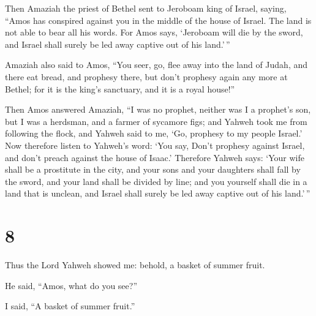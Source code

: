  Then Amaziah the priest of Bethel sent to Jeroboam king of
Israel, saying, ``Amos has conspired against you in the middle of the
house of Israel. The land is not able to bear all his words.
 For Amos says, `Jeroboam will die by the sword, and Israel
shall surely be led away captive out of his land.'\,''

 Amaziah also said to Amos, ``You seer, go, flee away into
the land of Judah, and there eat bread, and prophesy there,
 but don't prophesy again any more at Bethel; for it is the
king's sanctuary, and it is a royal house!''

 Then Amos answered Amaziah, ``I was no prophet, neither
was I a prophet's son, but I was a herdsman, and a farmer of sycamore
figs;  and Yahweh took me from following the flock, and
Yahweh said to me, `Go, prophesy to my people Israel.'  Now
therefore listen to Yahweh's word: `You say, Don't prophesy against
Israel, and don't preach against the house of Isaac.' 
Therefore Yahweh says: `Your wife shall be a prostitute in the city, and
your sons and your daughters shall fall by the sword, and your land
shall be divided by line; and you yourself shall die in a land that is
unclean, and Israel shall surely be led away captive out of his
land.'\,''

\hypertarget{section-7}{%
\section{8}\label{section-7}}

 Thus the Lord Yahweh showed me: behold, a basket of summer
fruit.

 He said, ``Amos, what do you see?''

I said, ``A basket of summer fruit.''

